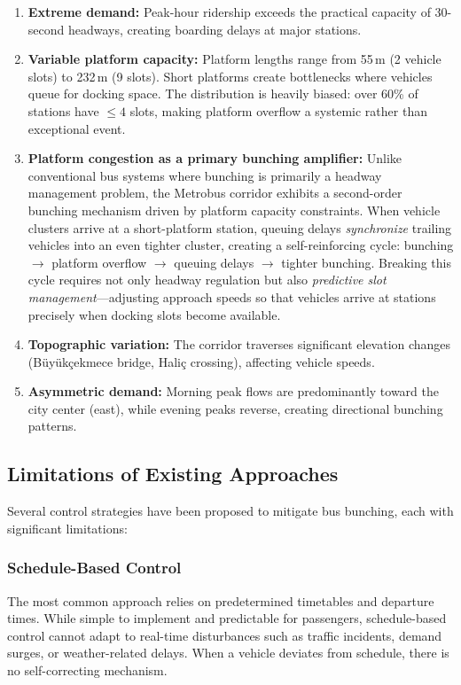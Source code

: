 \begin{enumerate}
    \item \textbf{Extreme demand:} Peak-hour ridership exceeds the practical capacity of 30-second headways, creating boarding delays at major stations.
    \item \textbf{Variable platform capacity:} Platform lengths range from 55\,m (2 vehicle slots) to 232\,m (9 slots). Short platforms create bottlenecks where vehicles queue for docking space. The distribution is heavily biased: over 60\% of stations have $\leq 4$ slots, making platform overflow a systemic rather than exceptional event.
    \item \textbf{Platform congestion as a primary bunching amplifier:} Unlike conventional bus systems where bunching is primarily a headway management problem, the Metrobus corridor exhibits a second-order bunching mechanism driven by platform capacity constraints. When vehicle clusters arrive at a short-platform station, queuing delays \textit{synchronize} trailing vehicles into an even tighter cluster, creating a self-reinforcing cycle: bunching $\rightarrow$ platform overflow $\rightarrow$ queuing delays $\rightarrow$ tighter bunching. Breaking this cycle requires not only headway regulation but also \textit{predictive slot management}---adjusting approach speeds so that vehicles arrive at stations precisely when docking slots become available.
    \item \textbf{Topographic variation:} The corridor traverses significant elevation changes (B\"uy\"uk\c{c}ekmece bridge, Hali\c{c} crossing), affecting vehicle speeds.
    \item \textbf{Asymmetric demand:} Morning peak flows are predominantly toward the city center (east), while evening peaks reverse, creating directional bunching patterns.
\end{enumerate}

\subsection{Limitations of Existing Approaches}

Several control strategies have been proposed to mitigate bus bunching, each with significant limitations:

\subsubsection{Schedule-Based Control}
The most common approach relies on predetermined timetables and departure times. While simple to implement and predictable for passengers, schedule-based control cannot adapt to real-time disturbances such as traffic incidents, demand surges, or weather-related delays. When a vehicle deviates from schedule, there is no self-correcting mechanism.

